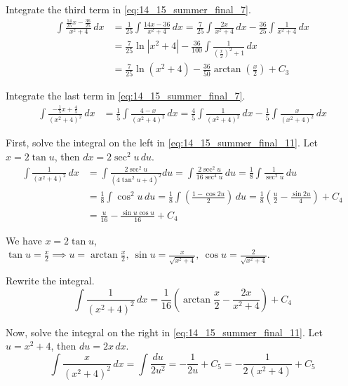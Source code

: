 \documentclass[a4paper, 12pt]{article}
\begin{document}
\begin{enumerate}[leftmargin=*,label=\textbf{\arabic*.}]
\begin{enumerate}[leftmargin=*,label=\textbf{\alph*.}]
Integrate the third term in \eqref{eq:14_15_summer_final_7}.
\begin{align}\int\frac{\frac{14}{25}x-\frac{36}{25}}{x^2+4}\,dx&=\frac1{25}\int\frac{14x-36}{x^2+4}\,dx=\frac{7}{25}\int\frac{2x}{x^2+4}\,dx-\frac{36}{25}\int\frac1{x^2+4}\,dx\nonumber\\[1em]&=\frac7{25}\ln\left|x^2+4\right|-\frac{36}{100}\int\frac1{\left(\frac x2\right)^2+1}\,dx\nonumber\\[1em]&=\frac7{25}\ln\left(x^2+4\right)-\frac{36}{50}\arctan\left(\frac x2\right)+C_3\label{eq:14_15_summer_final_10}\end{align}

Integrate the last term in \eqref{eq:14_15_summer_final_7}.
\begin{align}\int\frac{-\frac15x+\frac45}{\left(x^2+4\right)^2}\,dx&=\frac15\int\frac{4-x}{\left(x^2+4\right)^2}\,dx=\frac45\int\frac1{\left(x^2+4\right)^2}\,dx-\frac15\int\frac x{\left(x^2+4\right)^2}\,dx\label{eq:14_15_summer_final_11}\end{align}

First, solve the integral on the left in \eqref{eq:14_15_summer_final_11}. Let $x=2\tan u$, then $dx=2\sec^2u\,du$.
\begin{align*}\int\frac1{\left(x^2+4\right)^2}\,dx&=\int\frac{2\sec^2u}{\left(4\tan^2u+4\right)^2}du=\int\frac{2\sec^2u}{16\sec^4u}\,du=\frac18\int\frac1{\sec^2u}\,du\\[1em]&=\frac18\int\cos^2u\,du=\frac18\int\left(\frac{1-\cos2u}2\right)\,du=\frac18\left(\frac u2-\frac{\sin2u}4\right)+C_4\\[1em]&=\frac u{16}-\frac{\sin u\cos u}{16}+C_4\end{align*}

We have $x=2\tan u$, $\tan u=\frac x2\implies u=\arctan \frac x2,\: \sin u=\frac x{\sqrt{x^2+4}},\:\cos u=\frac 2{\sqrt{x^2+4}}$.

Rewrite the integral.
\begin{equation}\int\frac1{\left(x^2+4\right)^2}\,dx=\frac1{16}\left(\arctan \frac x2-\frac {2x}{x^2+4}\right)+C_4\label{eq:14_15_summer_final_12}\end{equation}

Now, solve the integral on the right in \eqref{eq:14_15_summer_final_11}. Let $u=x^2+4$, then $du=2x\,dx$.
\begin{equation}\int\frac x{\left(x^2+4\right)^2}\,dx=\int\frac{du}{2u^2}=-\frac1{2u}+C_5=-\frac1{2\left(x^2+4\right)}+C_5\label{eq:14_15_summer_final_13}\end{equation}


\end{enumerate}
\end{enumerate}
\end{document}
